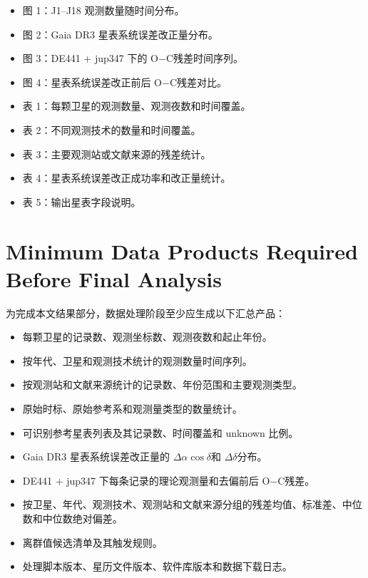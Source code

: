 \documentclass{aastex701}
\newcommand{\oc}{O$-$C}
\newcommand{\dra}{$\Delta\alpha\cos\delta$}
\newcommand{\ddec}{$\Delta\delta$}
\begin{document}
\begin{itemize}
    \item 图 1：J1--J18 观测数量随时间分布。
    \item 图 2：Gaia DR3 星表系统误差改正量分布。
    \item 图 3：DE441 + jup347 下的 \oc 残差时间序列。
    \item 图 4：星表系统误差改正前后 \oc 残差对比。
    \item 表 1：每颗卫星的观测数量、观测夜数和时间覆盖。
    \item 表 2：不同观测技术的数量和时间覆盖。
    \item 表 3：主要观测站或文献来源的残差统计。
    \item 表 4：星表系统误差改正成功率和改正量统计。
    \item 表 5：输出星表字段说明。
\end{itemize}

\section{Minimum Data Products Required Before Final Analysis} \label{app:data_requirements}

为完成本文结果部分，数据处理阶段至少应生成以下汇总产品：

\begin{itemize}
    \item 每颗卫星的记录数、观测坐标数、观测夜数和起止年份。
    \item 按年代、卫星和观测技术统计的观测数量时间序列。
    \item 按观测站和文献来源统计的记录数、年份范围和主要观测类型。
    \item 原始时标、原始参考系和观测量类型的数量统计。
    \item 可识别参考星表列表及其记录数、时间覆盖和 unknown 比例。
    \item Gaia DR3 星表系统误差改正量的 \dra 和 \ddec 分布。
    \item DE441 + jup347 下每条记录的理论观测量和去偏前后 \oc 残差。
    \item 按卫星、年代、观测技术、观测站和文献来源分组的残差均值、标准差、中位数和中位数绝对偏差。
    \item 离群值候选清单及其触发规则。
    \item 处理脚本版本、星历文件版本、软件库版本和数据下载日志。
\end{itemize}
\end{document}
